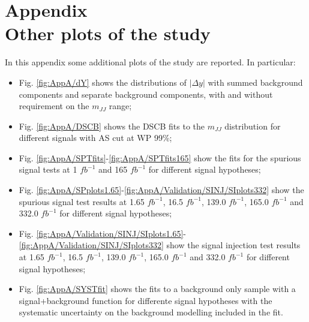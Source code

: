 


\chapter*{%
  \vspace*{-20pt}%
    {\huge\bfseries Appendix \thechapter}\\[1.5ex]%
  Other plots of the study%
}


In this appendix some additional plots of the study are reported.
In particular:
\begin{itemize}
  \item Fig. \ref{fig:AppA/dY} shows the distributions of $|\Delta y|$ with summed background components and separate background components, with and without requirement on the $m_{JJ}$ range;
  \item Fig. \ref{fig:AppA/DSCB} shows the DSCB fits to the $m_{JJ}$ distribution for different signals with AS cut at WP 99\%;
  \item Fig. \ref{fig:AppA/SPTfits}-\ref{fig:AppA/SPTfits165} show the fits for the spurious signal tests at 1 $fb^{-1}$ and 165 $fb^{-1}$ for different signal hypotheses;
  \item Fig. \ref{fig:AppA/SPplots1.65}-\ref{fig:AppA/Validation/SINJ/SIplots332} show the spurious signal test results at 1.65 $fb^{-1}$, 16.5 $fb^{-1}$, 139.0 $fb^{-1}$, 165.0 $fb^{-1}$ and 332.0 $fb^{-1}$ for different signal hypotheses;
  \item Fig. \ref{fig:AppA/Validation/SINJ/SIplots1.65}-\ref{fig:AppA/Validation/SINJ/SIplots332} show the signal injection test results at 1.65 $fb^{-1}$, 16.5 $fb^{-1}$, 139.0 $fb^{-1}$, 165.0 $fb^{-1}$ and 332.0 $fb^{-1}$ for different signal hypotheses;
  \item Fig. \ref{fig:AppA/SYSTfit} shows the fits to a background only sample with a signal+background function for differente signal hypotheses with the systematic uncertainty on the background modelling included in the fit.
\end{itemize}

